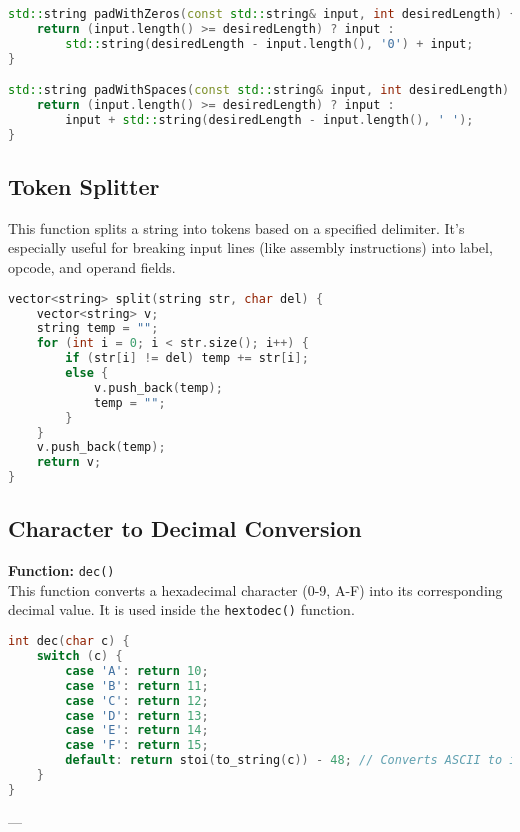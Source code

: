 \documentclass[12pt]{article}
\begin{document}
\begin{lstlisting}[language=C++, caption={padWithZeros() and padWithSpaces()}]
std::string padWithZeros(const std::string& input, int desiredLength) {
    return (input.length() >= desiredLength) ? input :
        std::string(desiredLength - input.length(), '0') + input;
}

std::string padWithSpaces(const std::string& input, int desiredLength) {
    return (input.length() >= desiredLength) ? input :
        input + std::string(desiredLength - input.length(), ' ');
}
\end{lstlisting}

\subsection{Token Splitter}
This function splits a string into tokens based on a specified delimiter. It's especially useful for breaking input lines (like assembly instructions) into label, opcode, and operand fields.

\begin{lstlisting}[language=C++, caption={split() - Tokenizing by delimiter}]
vector<string> split(string str, char del) {
    vector<string> v;
    string temp = "";
    for (int i = 0; i < str.size(); i++) {
        if (str[i] != del) temp += str[i];
        else {
            v.push_back(temp);
            temp = "";
        }
    }
    v.push_back(temp);
    return v;
}
\end{lstlisting}

\subsection{Character to Decimal Conversion}
\textbf{Function:} \texttt{dec()} \\
This function converts a hexadecimal character (0-9, A-F) into its corresponding decimal value. It is used inside the \texttt{hextodec()} function.

\begin{lstlisting}[language=C++, caption={dec() - Hex Character to Decimal}]
int dec(char c) {
    switch (c) {
        case 'A': return 10;
        case 'B': return 11;
        case 'C': return 12;
        case 'D': return 13;
        case 'E': return 14;
        case 'F': return 15;
        default: return stoi(to_string(c)) - 48; // Converts ASCII to int
    }
}
\end{lstlisting}

---
\end{document}
